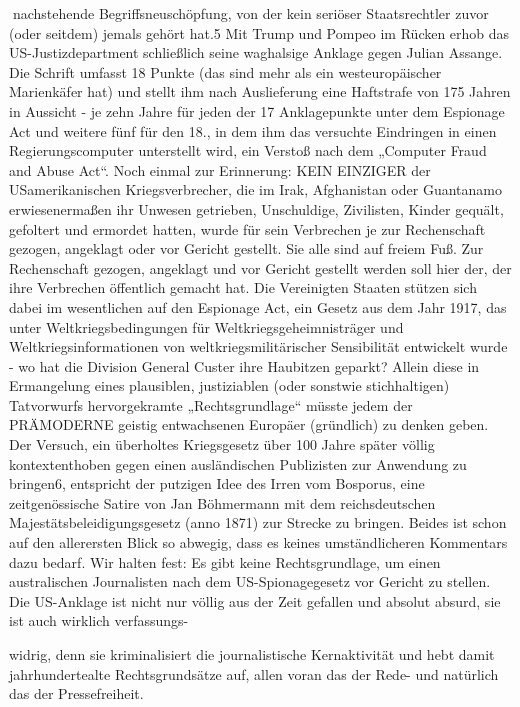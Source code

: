 \begin{multicols}{2}
nachstehende Begriffsneuschöpfung, von der kein seriöser Staatsrechtler zuvor (oder seitdem) jemals gehört
hat.5
Mit Trump und Pompeo im Rücken erhob das US-Justizdepartment schließlich seine waghalsige Anklage gegen
Julian Assange. Die Schrift umfasst 18 Punkte (das sind
mehr als ein westeuropäischer Marienkäfer hat) und
stellt ihm nach Auslieferung eine Haftstrafe von 175 Jahren in Aussicht - je zehn Jahre für jeden der 17 Anklagepunkte unter dem Espionage Act und weitere fünf für
den 18., in dem ihm das versuchte Eindringen in einen
Regierungscomputer unterstellt wird, ein Verstoß nach
dem „Computer Fraud and Abuse Act“.
Noch einmal zur Erinnerung: KEIN EINZIGER der USamerikanischen Kriegsverbrecher, die im Irak, Afghanistan oder Guantanamo erwiesenermaßen ihr Unwesen
getrieben, Unschuldige, Zivilisten, Kinder gequält, gefoltert und ermordet hatten, wurde für sein Verbrechen
je zur Rechenschaft gezogen, angeklagt oder vor Gericht
gestellt. Sie alle sind auf freiem Fuß. Zur Rechenschaft
gezogen, angeklagt und vor Gericht gestellt werden soll
hier der, der ihre Verbrechen öffentlich gemacht hat.
Die Vereinigten Staaten stützen sich dabei im wesentlichen auf den Espionage Act, ein Gesetz aus dem Jahr
1917, das unter Weltkriegsbedingungen für Weltkriegsgeheimnisträger und Weltkriegsinformationen von weltkriegsmilitärischer Sensibilität entwickelt wurde - wo
hat die Division General Custer ihre Haubitzen geparkt?
Allein diese in Ermangelung eines plausiblen, justiziablen (oder sonstwie stichhaltigen) Tatvorwurfs hervorgekramte „Rechtsgrundlage“ müsste jedem der PRÄMODERNE geistig entwachsenen Europäer (gründlich) zu
denken geben. Der Versuch, ein überholtes Kriegsgesetz
über 100 Jahre später völlig kontextenthoben gegen einen ausländischen Publizisten zur Anwendung zu bringen6, entspricht der putzigen Idee des Irren vom Bosporus, eine zeitgenössische Satire von Jan Böhmermann
mit dem reichsdeutschen Majestätsbeleidigungsgesetz
(anno 1871) zur Strecke zu bringen. Beides ist schon
auf den allerersten Blick so abwegig, dass es keines umständlicheren Kommentars dazu bedarf. Wir halten fest:
Es gibt keine Rechtsgrundlage, um einen australischen
Journalisten nach dem US-Spionagegesetz vor Gericht
zu stellen.
Die US-Anklage ist nicht nur völlig aus der Zeit gefallen
und absolut absurd, sie ist auch wirklich verfassungs-

widrig, denn sie kriminalisiert die journalistische Kernaktivität und hebt damit jahrhundertealte Rechtsgrundsätze auf, allen voran das der Rede- und natürlich das
der Pressefreiheit.


\end{multicols}

